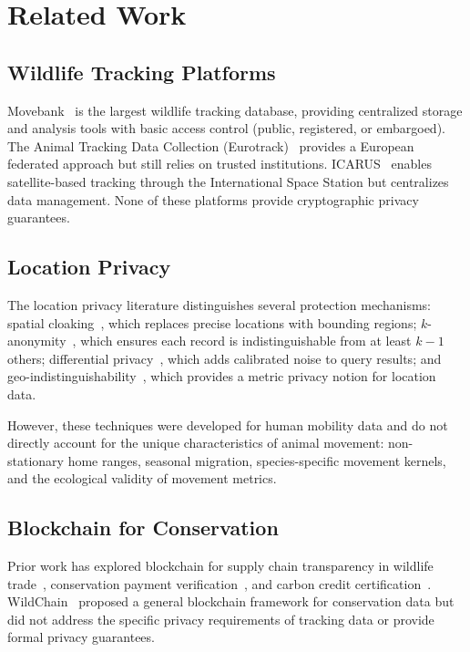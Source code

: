 \documentclass[11pt,letterpaper]{article}
\begin{document}
\section{Related Work}

\subsection{Wildlife Tracking Platforms}

Movebank~\cite{movebank2024} is the largest wildlife tracking database, providing centralized storage and analysis tools with basic access control (public, registered, or embargoed). The Animal Tracking Data Collection (Eurotrack)~\cite{eurotrack2020} provides a European federated approach but still relies on trusted institutions. ICARUS~\cite{wikelski2007} enables satellite-based tracking through the International Space Station but centralizes data management. None of these platforms provide cryptographic privacy guarantees.

\subsection{Location Privacy}

The location privacy literature distinguishes several protection mechanisms: spatial cloaking~\cite{gruteser2003}, which replaces precise locations with bounding regions; $k$-anonymity~\cite{sweeney2002}, which ensures each record is indistinguishable from at least $k-1$ others; differential privacy~\cite{dwork2006}, which adds calibrated noise to query results; and geo-indistinguishability~\cite{andres2013}, which provides a metric privacy notion for location data.

However, these techniques were developed for human mobility data and do not directly account for the unique characteristics of animal movement: non-stationary home ranges, seasonal migration, species-specific movement kernels, and the ecological validity of movement metrics.

\subsection{Blockchain for Conservation}

Prior work has explored blockchain for supply chain transparency in wildlife trade~\cite{maxwell2021}, conservation payment verification~\cite{kshetri2021}, and carbon credit certification~\cite{howson2019}. WildChain~\cite{wildchain2023} proposed a general blockchain framework for conservation data but did not address the specific privacy requirements of tracking data or provide formal privacy guarantees.
\end{document}

